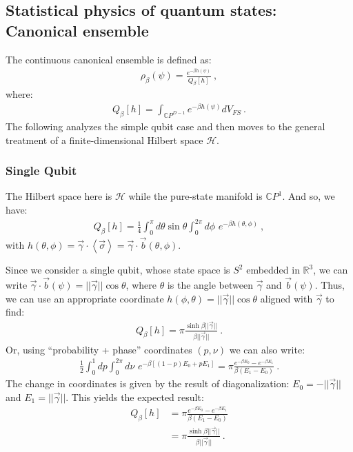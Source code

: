 \documentclass[draft,nofootinbib,pre,twocolumn,showpacs,showkeys,groupaddress,preprintnumbers,floatfix]{revtex4-1}
\newcommand{\1}{\mathbbm{1}}
\newcommand{\MV}[1]{\left\langle #1 \right\rangle}
\begin{document}
\subsection{Statistical physics of quantum states: Canonical ensemble}
\label{app:App}

The continuous canonical ensemble is defined as:
\begin{align*}
\rho_{\beta}(\psi) = \frac{e^{-\beta h(\psi)}}{Q_\beta[h]}
  ~,
\end{align*}
where:
\begin{align*}
Q_\beta[h] = \int_{\mathbb{C}P^{D-1}} e^{-\beta h(\psi)}  dV_{FS} 
  ~.
\end{align*}
The following analyzes the simple qubit case and then moves to the general
treatment of a finite-dimensional Hilbert space $\mathcal{H}$.

\subsubsection{Single Qubit}

The Hilbert space here is $\mathcal{H}$ while the pure-state manifold is
$\mathbb{C}P^1$. And so, we have:
\begin{align*}
Q_\beta[h] = \frac{1}{4} \int_0^{\pi} d \theta \sin \theta
  \int_{0}^{2\pi} d\phi \,\, e^{-\beta h(\theta,\phi)}
 ~,
\end{align*}
with $h(\theta,\phi) = \vec{\gamma} \cdot \MV{\vec{\sigma}} = \vec{\gamma}
\cdot \vec{b}(\theta,\phi)$.

Since we consider a single qubit, whose state space is $S^2$ embedded in
$\mathbb{R}^3$, we can write $\vec{\gamma} \cdot \vec{b}(\psi) = |\!|
\vec{\gamma} |\!| \cos \theta$, where $\theta$ is the angle between
$\vec{\gamma}$ and $\vec{b}(\psi)$. Thus, we can use an appropriate coordinate
$h(\phi,\theta) = |\!| \vec{\gamma} |\!| \cos \theta$ aligned with
$\vec{\gamma}$ to find:
\begin{align*}
Q_\beta[h]
  = \pi \frac{\sinh \beta |\!|\vec{\gamma}|\!|}{\beta |\!|\vec{\gamma}|\!|}
  ~.
\end{align*}
Or, using ``probability + phase'' coordinates $(p,\nu)$ we can also write:
\begin{align*}
\frac{1}{2}\int_0^1 dp \int_0^{2\pi} d \nu \,\,e^{-\beta [(1-p)E_0 + pE_1]} = \pi \frac{e^{-\beta E_0} - e^{-\beta E_1}}{\beta(E_1-E_0)}
  ~.
\end{align*}
The change in coordinates is given by the result of diagonalization: $E_{0} = -
|\!|\vec{\gamma}|\!|$ and $E_{1} = |\!|\vec{\gamma}|\!|$. This
yields the expected result:
\begin{align*}
Q_\beta[h]
  & = \pi \frac{e^{-\beta E_0} - e^{-\beta E_1}}{\beta(E_1-E_0)} \\
  & = \pi \frac{\sinh \beta |\!|\vec{\gamma}|\!|}{\beta |\!|\vec{\gamma}|\!|}
  ~.
\end{align*}
\end{document}
